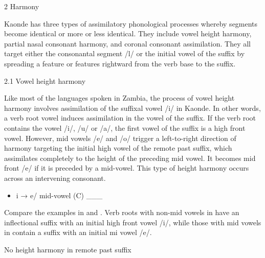 \documentclass[output=paper]{langsci/langscibook}
\begin{document}
\begin{stylelsSectioni}
2 Harmony 
\end{stylelsSectioni}

Kaonde has three types of assimilatory phonological processes whereby segments become identical or more or less identical. They include vowel height harmony, partial nasal consonant harmony, and coronal consonant assimilation. They all target either the consonantal segment /l/ or the initial vowel of the suffix by spreading a feature or features rightward from the verb base to the suffix.

\begin{stylelsSectionii}
2.1 Vowel height harmony
\end{stylelsSectionii}

Like most of the languages spoken in Zambia, the process of vowel height harmony involves assimilation of the suffixal vowel /i/ in Kaonde. In other words, a verb root vowel induces assimilation in the vowel of the suffix. If the verb root contains the vowel /i/, /u/ or /a/, the first vowel of the suffix is a high front vowel. However, mid vowels /e/ and /o/ trigger a left-to-right direction of harmony targeting the initial high vowel of the remote past suffix, which assimilates completely to the height of the preceding mid vowel. It becomes mid front /e/ if it is preceded by a mid-vowel. This type of height harmony occurs across an intervening consonant.

\begin{itemize}
\item \begin{stylelsLanginfo}
i → e/ mid-vowel (C) \_\_\_
\end{stylelsLanginfo}\end{itemize}

Compare the examples in  and . Verb roots with non-mid vowels in  have an inflectional suffix with an initial high front vowel /i/, while those with mid vowels in  contain a suffix with an initial mi vowel /e/. 

\begin{table}
\caption{No height harmony in remote past suffix}
\label{tab:2}
\end{table}
\end{document}
